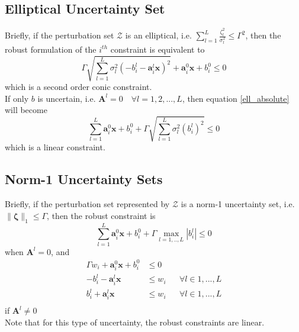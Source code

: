 \documentclass{article}
\renewcommand{\vec}{\mathbf}
\newcommand{\mat}{\mathbf}
\begin{document}
\begin{appendices}
\subsection{Elliptical Uncertainty Set}
Briefly, if the perturbation set $\mathcal{Z}$ is an elliptical, i.e. $\textstyle{\sum}_{l=1}^L\frac{\zeta_l^2}{\sigma_l^2} \leq \Gamma^2$, then the robust formulation of the $i^{th}$ constraint is equivalent to
\begin{equation}
\Gamma \sqrt{\textstyle{\sum}_{l=1}^L \sigma_l^2(- b^l_{i} - \vec{a}^l_{i}\vec{x})^2} + \vec{a}^0_{i}\vec{x} + b^0_{i} \leq 0
\label{ell_absolute}
\end{equation}
which is a second order conic constraint.\\
If only $b$ is uncertain, i.e. $\mat{A}^l = 0 \quad \forall l = 1,2,...,L$, then equation \eqref{ell_absolute} will become
\begin{equation}
\textstyle{\sum}_{l=1}^L \vec{a}^0_{i}\vec{x} + b^0_{i} + \Gamma \sqrt{\textstyle{\sum}_{l=1}^L \sigma_l^2(b^l_{i})^2} \leq 0
\label{ell_coeff}
\end{equation}
which is a linear constraint.
\subsection{Norm-1 Uncertainty Sets}
Briefly, if the perturbation set represented by $\mathcal{Z}$ is a norm-1 uncertainty set, i.e. $\|\vec{\zeta}\|_1 \leq \Gamma$, then the robust constraint is
\begin{equation}
\textstyle{\sum}_{l=1}^L \vec{a}^0_{i}\vec{x} + b^0_{i} + \Gamma \max_{l=1,..,L} |b^l_{i}| \leq 0
\label{rom_coeff}
\end{equation}
when $\mat{A}^l = 0$, and 
\begin{equation}
\begin{aligned}
\Gamma w_{i} + \vec{a}^0_{i}\vec{x} + b^0_{i} &\leq 0\\
- b^l_{i} - \vec{a}^l_{i}\vec{x} &\leq w_{i} &&\forall l \in 1,...,L\\
b^l_{i} + \vec{a}^l_{i}\vec{x} &\leq w_{i} &&\forall l \in 1,...,L\\
\end{aligned}
\label{rom_linear}
\end{equation}
if $\mat{A}^l \neq 0$\\
Note that for this type of uncertainty, the robust constraints are linear.

\end{appendices}
\end{document}
